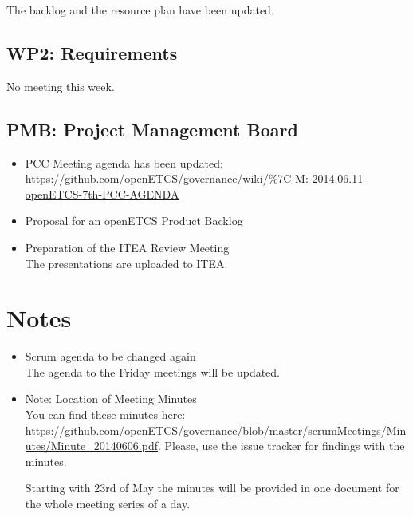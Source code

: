 \documentclass[a4paper, 11pt]{article}
\begin{document}
The backlog and the resource plan have been updated.

\subsection{WP2: Requirements}

No meeting this week.

\subsection{PMB: Project Management Board}
\begin{itemize}
\item PCC Meeting agenda has been updated: \url{https://github.com/openETCS/governance/wiki/%7C-M:-2014.06.11-openETCS-7th-PCC-AGENDA}
\item Proposal for an openETCS Product Backlog
\item Preparation of the ITEA Review Meeting\\
The presentations are uploaded to ITEA.

\end{itemize}

\section{Notes}
\begin{itemize}
\item Scrum agenda to be changed again\\
The agenda to the Friday meetings will be updated.

\item Note: Location of Meeting Minutes\\
You can find these minutes here: \url{https://github.com/openETCS/governance/blob/master/scrumMeetings/Minutes/Minute_20140606.pdf}. Please, use the issue tracker for findings with the minutes.

Starting with 23rd of May the minutes will be provided in one document for the whole meeting series of a day.

\end{itemize}
\end{document}
